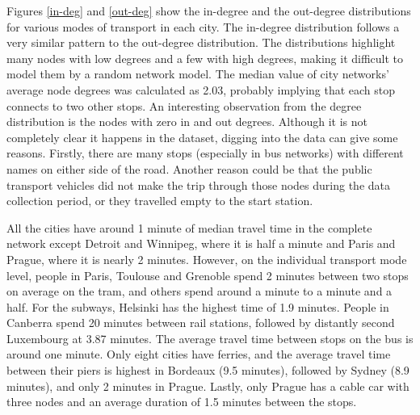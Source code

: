 \documentclass{article}
\theoremstyle{plain}
\theoremstyle{definition}
\theoremstyle{remark}
\begin{document}
Figures \ref{in-deg} and \ref{out-deg} show the in-degree and the out-degree distributions for various modes of transport in each city. The in-degree distribution follows a very similar pattern to the out-degree distribution. The distributions highlight many nodes with low degrees and a few with high degrees, making it difficult to model them by a random network model. The median value of city networks' average node degrees was calculated as 2.03, probably implying that each stop connects to two other stops. An interesting observation from the degree distribution is the nodes with zero in and out degrees. Although it is not completely clear it happens in the dataset, digging into the data can give some reasons. Firstly, there are many stops (especially in bus networks) with different names on either side of the road. Another reason could be that the public transport vehicles did not make the trip through those nodes during the data collection period, or they travelled empty to the start station.

All the cities have around 1 minute of median travel time in the complete network except Detroit and Winnipeg, where it is half a minute and Paris and Prague, where it is nearly 2 minutes. However, on the individual transport mode level, people in Paris, Toulouse and Grenoble spend 2 minutes between two stops on average on the tram, and others spend around a minute to a minute and a half. For the subways, Helsinki has the highest time of 1.9 minutes. People in Canberra spend 20 minutes between rail stations, followed by distantly second Luxembourg at 3.87 minutes. The average travel time between stops on the bus is around one minute. Only eight cities have ferries, and the average travel time between their piers is highest in Bordeaux (9.5 minutes), followed by Sydney (8.9 minutes), and only 2 minutes in Prague. Lastly, only Prague has a cable car with three nodes and an average duration of 1.5 minutes between the stops.
\end{document}

